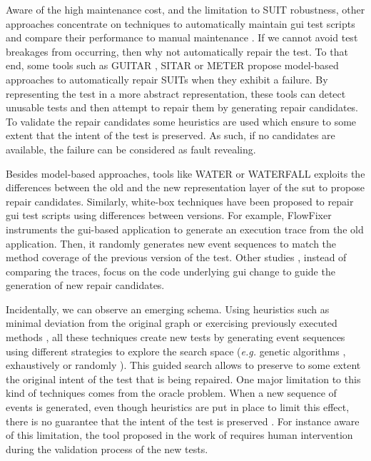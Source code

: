 Aware of the high maintenance cost, and the limitation to SUIT robustness, other approaches concentrate on techniques to automatically maintain \gls{gui} test scripts and compare their performance to manual maintenance \cite{Grechanik2009, Grechanik2009b}. If we cannot avoid test breakages from occurring, then why not automatically repair the test. To that end, some tools such as GUITAR \cite{Memon2008}, SITAR \cite{Gao2016} or METER \cite{Pan2020} propose model-based approaches to automatically repair SUITs when they exhibit a failure. By representing the test in a more abstract representation, these tools can detect unusable tests and then attempt to repair them by generating repair candidates. To validate the repair candidates some heuristics are used which ensure to some extent that the intent of the test is preserved. As such, if no candidates are available, the failure can be considered as fault revealing.

Besides model-based approaches, tools like WATER \cite{Choudhary2011} or WATERFALL \cite{Hammoudi2016b} exploits the differences between the old and the new representation layer of the \gls{sut} to propose repair candidates. Similarly, white-box techniques have been proposed to repair \gls{gui} test scripts using differences between versions. For example, FlowFixer \cite{Zhang2013} instruments the \gls{gui}-based application to generate an execution trace from the old application. Then, it randomly generates new event sequences to match the method coverage of the previous version of the test. Other studies \cite{Grechanik2009, Fu2009}, instead of comparing the traces, focus on the code underlying \gls{gui} change to guide the generation of new repair candidates.

Incidentally, we can observe an emerging schema. Using heuristics such as minimal deviation from the original graph\cite{Memon2008} or exercising previously executed methods \cite{Zhang2013}, all these techniques create new tests by generating event sequences using different strategies  to explore the search space (\emph{e.g.} genetic algorithms \cite{Huang2010}, exhaustively \cite{Memon2008} or randomly \cite{Zhang2013}). This guided search allows to preserve to some extent the original intent of the test that is being repaired. One major limitation to this kind of techniques comes from the oracle problem. When a new sequence of events is generated, even though heuristics are put in place to limit this effect, there is no guarantee that the intent of the test is preserved \cite{Li2019}. For instance aware of this limitation, the tool proposed in the work of \textcite{Gao2016} requires human intervention during the validation process of the new tests.

